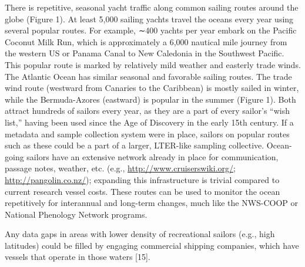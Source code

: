 There is repetitive, seasonal yacht traffic along common sailing routes around the globe (Figure 1). At least 5,000 sailing yachts travel the oceans every year using several popular routes. For example, ∼400 yachts per year embark on the Pacific Coconut Milk Run, which is approximately a 6,000 nautical mile journey from the western US or Panama Canal to New Caledonia in the Southwest Pacific. This popular route is marked by relatively mild weather and easterly trade winds. The Atlantic Ocean has similar seasonal and favorable sailing routes. The trade wind route (westward from Canaries to the Caribbean) is mostly sailed in winter, while the Bermuda-Azores (eastward) is popular in the summer (Figure 1). Both attract hundreds of sailors every year, as they are a part of every sailor's “wish list,” having been used since the Age of Discovery in the early 15th century. If a metadata and sample collection system were in place, sailors on popular routes such as these could be a part of a larger, LTER-like sampling collective. Ocean-going sailors have an extensive network already in place for communication, passage notes, weather, etc. (e.g., \url{http://www.cruiserswiki.org/}; \url{http://pangolin.co.nz/}); expanding this infrastructure is trivial compared to current research vessel costs. These routes can be used to monitor the ocean repetitively for interannual and long-term changes, much like the NWS-COOP or National Phenology Network programs.

Any data gaps in areas with lower density of recreational sailors (e.g., high latitudes) could be filled by engaging commercial shipping companies, which have vessels that operate in those waters [15].

